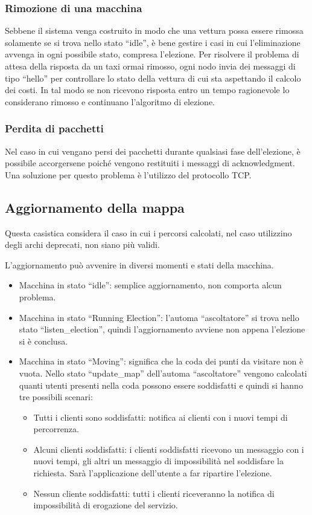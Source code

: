 \subsubsection{Rimozione di una macchina}
Sebbene il sistema venga costruito in modo che una vettura possa essere rimossa solamente se si trova nello stato ``idle'', è bene gestire i casi in cui l'eliminazione avvenga in ogni possibile stato, compresa l'elezione. Per risolvere il problema di attesa della risposta da un taxi ormai rimosso, ogni nodo invia dei messaggi di tipo ``hello'' per controllare lo stato della vettura di cui sta aspettando il calcolo dei costi. In tal modo se non ricevono risposta entro un tempo ragionevole lo considerano rimosso e continuano l'algoritmo di elezione.

\subsubsection{Perdita di pacchetti}
Nel caso in cui vengano persi dei pacchetti durante qualsiasi fase dell'elezione, è possibile accorgersene poiché vengono restituiti i messaggi di acknowledgment. Una soluzione per questo problema è l'utilizzo del protocollo TCP.

\subsection{Aggiornamento della mappa}\label{aggiornamento_mappa}

Questa casistica considera il caso in cui i percorsi calcolati, nel caso utilizzino degli archi deprecati, non siano più validi. 

L'aggiornamento può avvenire in diversi momenti e stati della macchina. 

\begin{itemize}
	\item Macchina in stato ``idle'': semplice aggiornamento, non comporta alcun problema.
	\item Macchina in stato ``Running Election'': l'automa ``ascoltatore'' si trova nello stato ``listen\_election'', quindi l'aggiornamento avviene non appena l'elezione si è conclusa.
	\item Macchina in stato ``Moving'': significa che la coda dei punti da visitare non è vuota. Nello stato ``update\_map'' dell'automa ``ascoltatore'' vengono calcolati quanti utenti presenti nella coda possono essere soddisfatti e quindi si hanno tre possibili scenari:
	\begin{itemize}
		\item Tutti i clienti sono soddisfatti: notifica ai clienti con i nuovi tempi di percorrenza.
		\item Alcuni clienti soddisfatti: i clienti soddisfatti ricevono un messaggio con i nuovi tempi, gli altri un messaggio di impossibilità nel soddisfare la richiesta. Sarà l'applicazione dell'utente a far ripartire l'elezione.
		\item Nessun cliente soddisfatti: tutti i clienti riceveranno la notifica di impossibilità di erogazione del servizio.
	\end{itemize}
\end{itemize}

